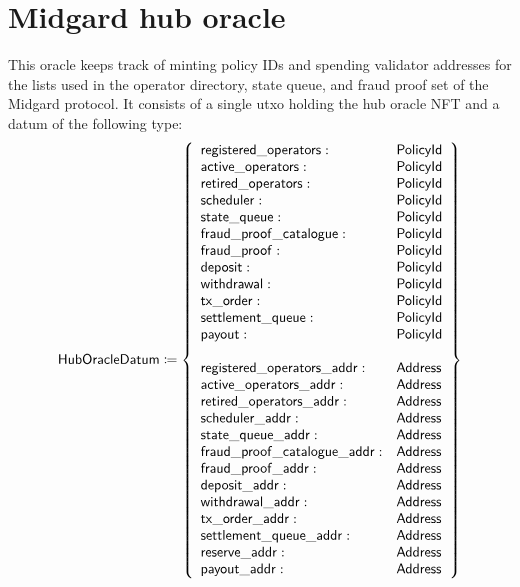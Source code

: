 \documentclass[../midgard.tex]{subfiles}
\begin{document}
\section{Midgard hub oracle}
\label{h:midgard-hub-oracle}

This oracle keeps track of minting policy IDs and spending validator addresses for the lists used in the operator directory, state queue, and fraud proof set of the Midgard protocol.
It consists of a single utxo holding the hub oracle NFT and a datum of the following type:
\begin{equation*}
    \mathsf{HubOracleDatum} \coloneq \left\{
    \begin{array}{ll}
        \mathsf{registered\_operators} : & \mathsf{PolicyId} \\
        \mathsf{active\_operators} : & \mathsf{PolicyId} \\
        \mathsf{retired\_operators} : & \mathsf{PolicyId} \\
        \mathsf{scheduler} : & \mathsf{PolicyId} \\
        \mathsf{state\_queue} : & \mathsf{PolicyId} \\
        \mathsf{fraud\_proof\_catalogue} : & \mathsf{PolicyId} \\
        \mathsf{fraud\_proof} : & \mathsf{PolicyId} \\
        \mathsf{deposit} : & \mathsf{PolicyId} \\
        \mathsf{withdrawal} : & \mathsf{PolicyId} \\
        \mathsf{tx\_order} : & \mathsf{PolicyId} \\
        \mathsf{settlement\_queue} : & \mathsf{PolicyId} \\
        \mathsf{payout} : & \mathsf{PolicyId} \\
        \\
        \mathsf{registered\_operators\_addr} : & \mathsf{Address} \\
        \mathsf{active\_operators\_addr} : & \mathsf{Address} \\
        \mathsf{retired\_operators\_addr} : & \mathsf{Address} \\
        \mathsf{scheduler\_addr} : & \mathsf{Address} \\
        \mathsf{state\_queue\_addr} : & \mathsf{Address} \\
        \mathsf{fraud\_proof\_catalogue\_addr} : & \mathsf{Address} \\
        \mathsf{fraud\_proof\_addr} : & \mathsf{Address} \\
        \mathsf{deposit\_addr} : & \mathsf{Address} \\
        \mathsf{withdrawal\_addr} : & \mathsf{Address} \\
        \mathsf{tx\_order\_addr} : & \mathsf{Address} \\
        \mathsf{settlement\_queue\_addr} : & \mathsf{Address} \\
        \mathsf{reserve\_addr} : & \mathsf{Address} \\ 
        \mathsf{payout\_addr} : & \mathsf{Address}
    \end{array} \right\}
\end{equation*}
\end{document}
